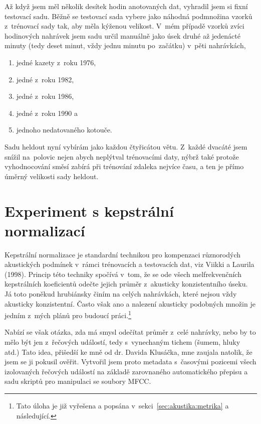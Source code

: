 Až když jsem měl několik desítek hodin anotovaných dat, vyhradil jsem si fixní
testovací sadu. Běžně se testovací sada vybere jako náhodná podmnožina vzorků
z~trénovací sady tak, aby měla kýženou velikost. V~mém případě vzorků zvíci
hodinových nahrávek jsem sadu určil manuálně jako úsek druhé až jedenácté minuty
(tedy deset minut, vždy jednu minutu po~začátku) v~pěti nahrávkách,
\begin{enumerate}
\item{jedné kazety z~roku 1976,}
\item{jedné z~roku 1982,}
\item{jedné z~roku 1986,}
\item{jedné z~roku 1990 a}
\item{jednoho nedatovaného kotouče.}
\end{enumerate}

Sadu heldout nyní vybírám jako každou čtyřicátou větu. Z~každé dvacáté jsem
snížil na~polovic nejen abych neplýtval trénovacími daty, nýbrž také protože
vyhodnocování směsí zabírá při trénování zdaleka nejvíce času, a ten je přímo
úměrný velikosti sady heldout.

\section{Experiment s kepstrální normalizací}
\label{sec:mfcc-norm}

Kepstrální normalizace je standardní technikou pro kompenzaci různorodých
akustických podmínek v~rámci trénovacích a testovacích dat, viz Viikki a Laurila
(1998)\cite{viikki1998cepstral}. Princip této techniky spočívá v~tom, že se ode
všech melfrekvenčních kepstrálních koeficientů odečte jejich průměr z~akusticky
konzistentního úseku. Já toto poněkud hrubiánsky činím na celých nahrávkách,
které nejsou vždy akusticky konzistentní. Často však ano a nalezení akusticky
podobných množin je jedním z~mých plánů pro budoucí práci.\footnote{Tato úloha
je již vyřešena a popsána v~sekci~\ref{sec:akustika:metrika} a následující.}

Nabízí se však otázka, zda má smysl odečítat průměr z~celé nahrávky, nebo by to
mělo být jen z~řečových událostí, tedy s~vynechaným tichem (šumem, hluky atd.)
Tato idea, přišedší ke mně od dr. Davida Klusáčka, mne zaujala natolik, že jsem se
ji pokusil ověřit. Vytvořil jsem proto metadata s~časovými pozicemi všech
izolovaných řečových událostí na základě zarovnaného automatického přepisu a sadu skriptů
pro manipulaci se soubory MFCC.

